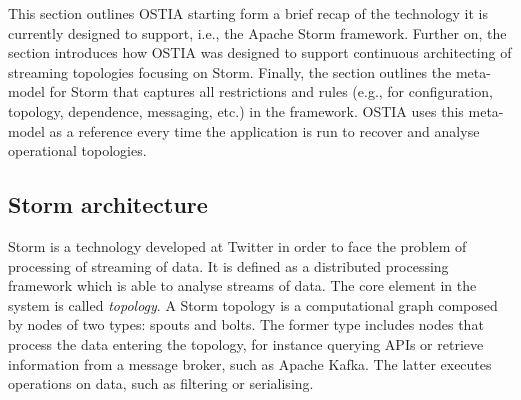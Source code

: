 

This section outlines OSTIA starting form a brief recap of the technology it is currently designed to support, i.e., the Apache Storm framework. Further on, the section introduces how OSTIA was designed to support continuous architecting of streaming topologies focusing on Storm. Finally, the section outlines the meta-model for Storm that captures all restrictions and rules (e.g., for configuration, topology, dependence, messaging, etc.) in the framework. OSTIA uses this meta-model as a reference every time the application is run to recover and analyse operational topologies.

\subsection{Storm architecture}

Storm is a technology developed at Twitter \cite{toshniwal2014storm} in order to
face the problem of processing of streaming of data. It is defined as a
distributed processing framework which is able to analyse streams of data. The
core element in the system is called \emph{topology}. A Storm topology is a
computational graph composed by nodes of two types: spouts and bolts. The former
type includes nodes that process the data entering the topology, for instance
querying APIs or retrieve information from a message broker, such as Apache
Kafka. The latter executes operations on data, such as filtering or serialising.

